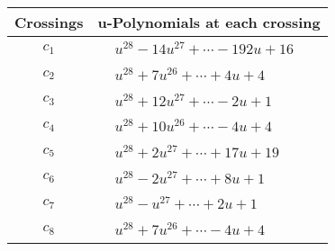 \documentclass[1p]{elsarticle_modified}
\theoremstyle{definition}
\begin{document}
\begin{tabular}{m{50pt}|m{274pt}}
Crossings & \hspace{64pt}u-Polynomials at each crossing \\
\hline $$\begin{aligned}c_{1}\end{aligned}$$&$\begin{aligned}
&u^{28}-14 u^{27}+\cdots-192 u+16
\end{aligned}$\\
\hline $$\begin{aligned}c_{2}\end{aligned}$$&$\begin{aligned}
&u^{28}+7 u^{26}+\cdots+4 u+4
\end{aligned}$\\
\hline $$\begin{aligned}c_{3}\end{aligned}$$&$\begin{aligned}
&u^{28}+12 u^{27}+\cdots-2 u+1
\end{aligned}$\\
\hline $$\begin{aligned}c_{4}\end{aligned}$$&$\begin{aligned}
&u^{28}+10 u^{26}+\cdots-4 u+4
\end{aligned}$\\
\hline $$\begin{aligned}c_{5}\end{aligned}$$&$\begin{aligned}
&u^{28}+2 u^{27}+\cdots+17 u+19
\end{aligned}$\\
\hline $$\begin{aligned}c_{6}\end{aligned}$$&$\begin{aligned}
&u^{28}-2 u^{27}+\cdots+8 u+1
\end{aligned}$\\
\hline $$\begin{aligned}c_{7}\end{aligned}$$&$\begin{aligned}
&u^{28}- u^{27}+\cdots+2 u+1
\end{aligned}$\\
\hline $$\begin{aligned}c_{8}\end{aligned}$$&$\begin{aligned}
&u^{28}+7 u^{26}+\cdots-4 u+4
\end{aligned}$\\

\end{tabular}
\end{document}
